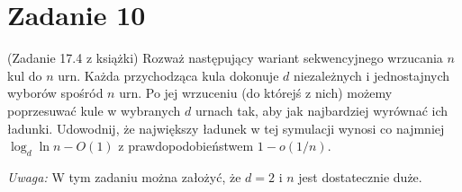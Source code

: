 \section[\nierozwiazane{Zadanie 10}]{Zadanie 10}
 (Zadanie 17.4 z książki) Rozważ następujący wariant sekwencyjnego wrzucania
\(n\) kul do \(n\) urn. Każda przychodząca kula dokonuje \(d\) niezależnych i jednostajnych
wyborów spośród \(n\) urn. Po jej wrzuceniu (do którejś z nich) możemy poprzesuwać kule
w wybranych \(d\) urnach tak, aby jak najbardziej wyrównać ich ładunki. Udowodnij, że
największy ładunek w tej symulacji wynosi co najmniej \(\log_d \ln n - O(1)\) z prawdopodobieństwem \(1 - o(1/n)\).

\textit{Uwaga:} W tym zadaniu można założyć, że \(d = 2\) i \(n\) jest dostatecznie duże.

\brakrozwiazania
